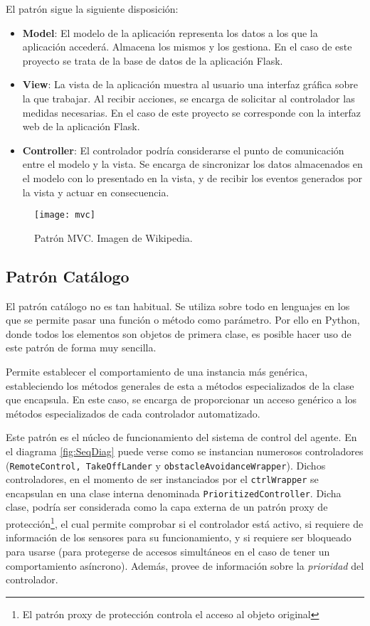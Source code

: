 El patrón sigue la siguiente disposición: 
\begin{itemize}
\item \textbf{Model}: El modelo de la aplicación representa los datos a los que la aplicación accederá. Almacena los mismos y los gestiona. En el caso de este proyecto se trata de la base de datos de la aplicación Flask.
\item \textbf{View}: La vista de la aplicación muestra al usuario una interfaz gráfica sobre la que trabajar. Al recibir acciones, se encarga de solicitar al controlador las medidas necesarias. En el caso de este proyecto se corresponde con la interfaz web de la aplicación Flask.
\item \textbf{Controller}: El controlador podría considerarse el punto de comunicación entre el modelo y la vista. Se encarga de sincronizar los datos almacenados en el modelo con lo presentado en la vista, y de recibir los eventos generados por la vista y actuar en consecuencia.
\end{itemize}

\begin{figure}
	\centering
	\texttt{[image: mvc]}
	\caption{Patrón MVC. Imagen de Wikipedia.}\label{fig:mvc}
\end{figure}

\subsection{Patrón Catálogo}
\label{subsec:patternCatalog}
El patrón catálogo no es tan habitual. Se utiliza sobre todo en lenguajes en los que se permite pasar una función o método como parámetro. Por ello en Python, donde todos los elementos son objetos de primera clase, es posible hacer uso de este patrón de forma muy sencilla. 

Permite establecer el comportamiento de una instancia más genérica, estableciendo los métodos generales de esta a métodos especializados de la clase que encapsula. En este caso, se encarga de proporcionar un acceso genérico a los métodos especializados de cada controlador automatizado. 

Este patrón es el núcleo de funcionamiento del sistema de control del agente. En el diagrama \ref{fig:SeqDiag} puede verse como se instancian numerosos controladores (\texttt{RemoteControl, TakeOffLander} y  \texttt{obstacleAvoidanceWrapper}). Dichos controladores, en el momento de ser instanciados por el \texttt{ctrlWrapper} se encapsulan en una clase interna denominada \texttt{PrioritizedController}. Dicha clase, podría ser considerada como la capa externa de un patrón proxy de protección\footnote{El patrón proxy de protección controla el acceso al objeto original}, el cual permite comprobar si el controlador está activo, si requiere de información de los sensores para su funcionamiento, y si requiere ser bloqueado para usarse (para protegerse de accesos simultáneos en el caso de tener un comportamiento asíncrono). Además, provee de información sobre la \emph{prioridad} del controlador. 

